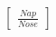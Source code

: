 \documentclass[preview]{standalone}
\begin{document}
\begin{align*}
\begin{bmatrix} \frac{Nap}{Nose} \end{bmatrix}
\end{align*}
\end{document}
